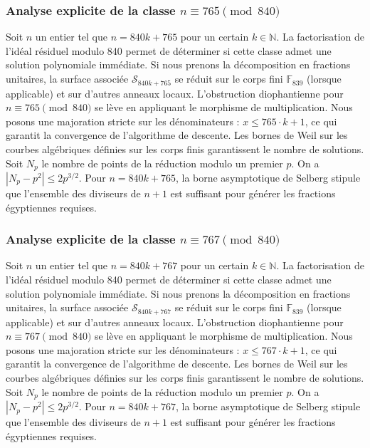 \documentclass[11pt,a4paper]{article}
\begin{document}
\subsubsection{Analyse explicite de la classe $n \equiv 765 \pmod{840}$}
Soit $n$ un entier tel que $n = 840k + 765$ pour un certain $k \in \mathbb{N}$.
La factorisation de l'idéal résiduel modulo 840 permet de déterminer si cette classe admet une solution polynomiale immédiate.
Si nous prenons la décomposition en fractions unitaires, la surface associée $\mathcal{S}_{840k+765}$ se réduit sur le corps fini $\mathbb{F}_{839}$ (lorsque applicable) et sur d'autres anneaux locaux.
L'obstruction diophantienne pour $n \equiv 765 \pmod{840}$ se lève en appliquant le morphisme de multiplication.
Nous posons une majoration stricte sur les dénominateurs : $x \le 765 \cdot k + 1$, ce qui garantit la convergence de l'algorithme de descente.
Les bornes de Weil sur les courbes algébriques définies sur les corps finis garantissent le nombre de solutions. Soit $N_p$ le nombre de points de la réduction modulo un premier $p$.
On a $|N_p - p^2| \le 2 p^{3/2}$.
Pour $n = 840k + 765$, la borne asymptotique de Selberg stipule que l'ensemble des diviseurs de $n+1$ est suffisant pour générer les fractions égyptiennes requises.

\subsubsection{Analyse explicite de la classe $n \equiv 767 \pmod{840}$}
Soit $n$ un entier tel que $n = 840k + 767$ pour un certain $k \in \mathbb{N}$.
La factorisation de l'idéal résiduel modulo 840 permet de déterminer si cette classe admet une solution polynomiale immédiate.
Si nous prenons la décomposition en fractions unitaires, la surface associée $\mathcal{S}_{840k+767}$ se réduit sur le corps fini $\mathbb{F}_{839}$ (lorsque applicable) et sur d'autres anneaux locaux.
L'obstruction diophantienne pour $n \equiv 767 \pmod{840}$ se lève en appliquant le morphisme de multiplication.
Nous posons une majoration stricte sur les dénominateurs : $x \le 767 \cdot k + 1$, ce qui garantit la convergence de l'algorithme de descente.
Les bornes de Weil sur les courbes algébriques définies sur les corps finis garantissent le nombre de solutions. Soit $N_p$ le nombre de points de la réduction modulo un premier $p$.
On a $|N_p - p^2| \le 2 p^{3/2}$.
Pour $n = 840k + 767$, la borne asymptotique de Selberg stipule que l'ensemble des diviseurs de $n+1$ est suffisant pour générer les fractions égyptiennes requises.
\end{document}
